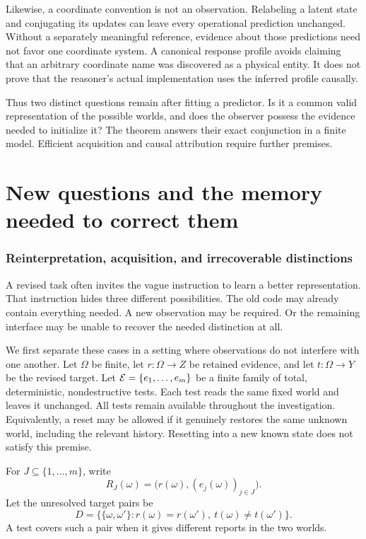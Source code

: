 \documentclass[11pt,letterpaper]{article}
\theoremstyle{plain}
\theoremstyle{definition}
\begin{document}
Likewise, a coordinate convention is not an observation. Relabeling a latent state and conjugating its updates can leave every operational prediction unchanged. Without a separately meaningful reference, evidence about those predictions need not favor one coordinate system. A canonical response profile avoids claiming that an arbitrary coordinate name was discovered as a physical entity. It does not prove that the reasoner's actual implementation uses the inferred profile causally.

Thus two distinct questions remain after fitting a predictor. Is it a common valid representation of the possible worlds, and does the observer possess the evidence needed to initialize it? The theorem answers their exact conjunction in a finite model. Efficient acquisition and causal attribution require further premises.


\FloatBarrier\clearpage
\part{New questions and the memory needed to correct them}
\section{Reinterpretation, acquisition, and irrecoverable distinctions}\label{sec:trichotomy}
A revised task often invites the vague instruction to learn a better representation. That instruction hides three different possibilities. The old code may already contain everything needed. A new observation may be required. Or the remaining interface may be unable to recover the needed distinction at all.

We first separate these cases in a setting where observations do not interfere with one another. Let $\Omega$ be finite, let $r:\Omega\to Z$ be retained evidence, and let $t:\Omega\to Y$ be the revised target. Let $\mathcal E=\{e_1,\ldots,e_m\}$ be a finite family of total, deterministic, nondestructive tests. Each test reads the same fixed world and leaves it unchanged. All tests remain available throughout the investigation. Equivalently, a reset may be allowed if it genuinely restores the same unknown world, including the relevant history. Resetting into a new known state does not satisfy this premise.

For $J\subseteq\{1,\ldots,m\}$, write
\[
R_J(\omega)=\bigl(r(\omega),(e_j(\omega))_{j\in J}\bigr).
\]
Let the unresolved target pairs be
\[
D=\{\{\omega,\omega'\}:r(\omega)=r(\omega'),\ t(\omega)\ne t(\omega')\}.
\]
A test covers such a pair when it gives different reports in the two worlds.
\end{document}
